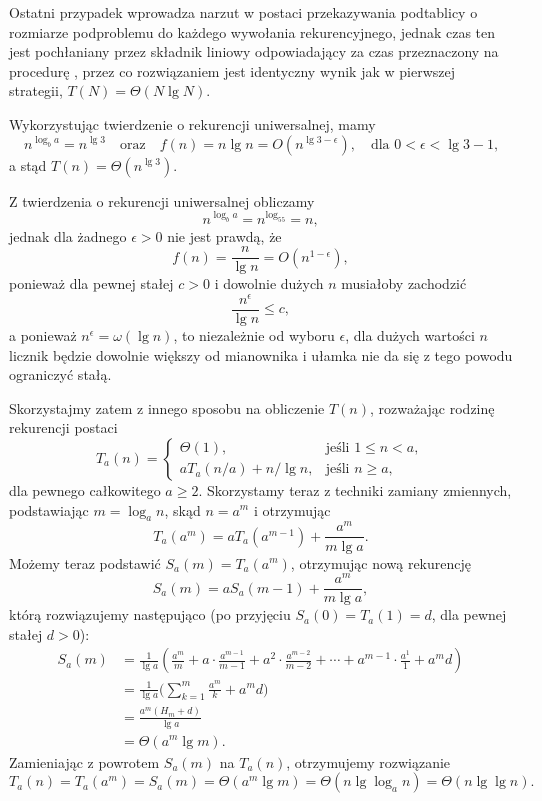 Ostatni przypadek wprowadza narzut w postaci przekazywania podtablicy o rozmiarze podproblemu do każdego wywołania rekurencyjnego, jednak czas ten jest pochłaniany przez składnik liniowy odpowiadający za czas przeznaczony na procedurę , przez co rozwiązaniem jest identyczny wynik jak w pierwszej strategii, $T(N)=\Theta(N\lg N)$.


\subproblem %
Wykorzystując twierdzenie o rekurencji uniwersalnej, mamy
\[
	n^{\log_ba} = n^{\lg3} \quad\text{oraz}\quad f(n) = n\lg n = O(n^{\lg3-\epsilon}), \quad\text{dla $0<\epsilon<\lg3-1$,}
\]
a stąd $T(n)=\Theta(n^{\lg3})$.

\subproblem %
Z twierdzenia o rekurencji uniwersalnej obliczamy
\[
	n^{\log_ba} = n^{\log_55} = n,
\]
jednak dla żadnego $\epsilon>0$ nie jest prawdą, że
\[
	f(n) = \frac{n}{\lg n} = O(n^{1-\epsilon}),
\]
ponieważ dla pewnej stałej $c>0$ i dowolnie dużych $n$ musiałoby zachodzić
\[
	\frac{n^\epsilon}{\lg n} \le c,
\]
a ponieważ $n^\epsilon=\omega(\lg n)$, to niezależnie od wyboru $\epsilon$, dla dużych wartości $n$ licznik będzie dowolnie większy od mianownika i ułamka nie da się z tego powodu ograniczyć stałą.

Skorzystajmy zatem z innego sposobu na obliczenie $T(n)$, rozważając rodzinę rekurencji postaci
\[
	T_a(n) = \begin{cases}
		\Theta(1), & \text{jeśli $1\le n<a$}, \\
		aT_a(n/a)+n/\!\lg n, & \text{jeśli $n\ge a$},
	\end{cases}
\]
dla pewnego całkowitego $a\ge2$. Skorzystamy teraz z techniki zamiany zmiennych, podstawiając $m=\log_an$, skąd $n=a^m$ i otrzymując
\[
	T_a(a^m) = aT_a(a^{m-1})+\frac{a^m}{m\lg a}.
\]
Możemy teraz podstawić $S_a(m)=T_a(a^m)$, otrzymując nową rekurencję
\[
	S_a(m) = aS_a(m-1)+\frac{a^m}{m\lg a},
\]
którą rozwiązujemy następująco (po przyjęciu $S_a(0)=T_a(1)=d$, dla pewnej stałej $d>0$):
\begin{align*}
	S_a(m) &= \frac{1}{\lg a}\left(\frac{a^m}{m}+a\cdot\frac{a^{m-1}}{m-1}+a^2\cdot\frac{a^{m-2}}{m-2}+\cdots+a^{m-1}\cdot\frac{a^1}{1}+a^md\right) \\[1mm]
	&= \frac{1}{\lg a}\biggl(\sum_{k=1}^m\frac{a^m}{k}+a^md\biggr) \\[1mm]
	&= \frac{a^m(H_m+d)}{\lg a} \\[1mm]
	&= \Theta(a^m\lg m).
\end{align*}
Zamieniając z powrotem $S_a(m)$ na $T_a(n)$, otrzymujemy rozwiązanie
\[
	T_a(n) = T_a(a^m) = S_a(m) = \Theta(a^m\lg m) = \Theta(n\lg\log_a n) = \Theta(n\lg\lg n).
\]

